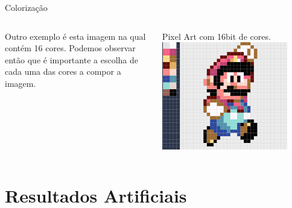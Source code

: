 \documentclass[compress,12pt]{beamer}
\begin{document}
\begin{frame}{Colorização}
	\begin{columns}
		\begin{column}{0.5\textwidth}
			        
			{Outro exemplo é esta imagem na qual contém 16 cores.}
            \vfill
            {Podemos observar então que é importante a escolha de cada uma das cores a compor a imagem.}
			        
		\end{column}
		\begin{column}{0.5\textwidth}  %
			\begin{center}
                {Pixel Art com 16bit de cores.}    
				\includegraphics[width=0.85\textwidth]{Images/16bitImage.png}
			\end{center}
		\end{column}
	\end{columns}
\end{frame}

\section{Resultados Artificiais}
\end{document}
